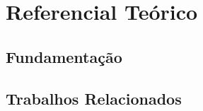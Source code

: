 \chapter{Referencial Teórico}\label{sec:RefTeorico}


\section{Fundamentação}\label{sec:fundamentacao}

\section{Trabalhos Relacionados}\label{sec:TrabRel}

